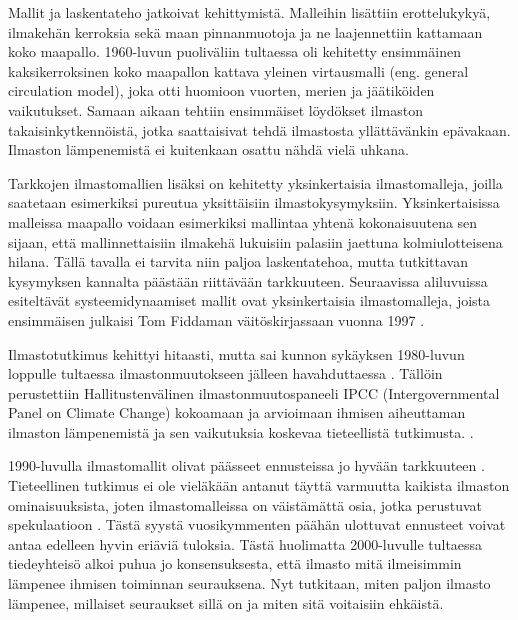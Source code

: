 \documentclass[finnish,12pt,a4paper,pdftex]{article}
\begin{document}
\begin{onehalfspacing}
Mallit ja laskentateho jatkoivat kehittymistä. Malleihin lisättiin erottelukykyä, ilmakehän kerroksia sekä maan pinnanmuotoja ja ne laajennettiin kattamaan koko maapallo. 1960-luvun puoliväliin tultaessa oli kehitetty ensimmäinen kaksikerroksinen koko maapallon kattava yleinen virtausmalli (eng. general circulation model), joka otti huomioon vuorten, merien ja jäätiköiden vaikutukset. \cite{AmericanInstituteofPhysicsGCM} Samaan aikaan tehtiin ensimmäiset löydökset ilmaston takaisinkytkennöistä, jotka saattaisivat tehdä ilmastosta yllättävänkin epävakaan. Ilmaston lämpenemistä ei kuitenkaan osattu nähdä vielä uhkana. \cite{AmericanInstituteofPhysics} 

Tarkkojen ilmastomallien lisäksi on kehitetty yksinkertaisia ilmastomalleja, joilla saatetaan esimerkiksi pureutua yksittäisiin ilmastokysymyksiin. Yksinkertaisissa malleissa maapallo voidaan esimerkiksi mallintaa yhtenä kokonaisuutena sen sijaan, että mallinnettaisiin ilmakehä lukuisiin palasiin jaettuna kolmiulotteisena hilana. Tällä tavalla ei tarvita niin paljoa laskentatehoa, mutta tutkittavan kysymyksen kannalta päästään riittävään tarkkuuteen. \cite{AmericanInstituteofPhysicsSimple} Seuraavissa aliluvuissa esiteltävät systeemidynaamiset mallit ovat yksinkertaisia ilmastomalleja, joista ensimmäisen julkaisi Tom Fiddaman väitöskirjassaan vuonna 1997 \cite{Fiddaman1997}. 

Ilmastotutkimus kehittyi hitaasti, mutta sai kunnon sykäyksen 1980-luvun loppulle tultaessa ilmastonmuutokseen jälleen havahduttaessa  \cite{AmericanInstituteofPhysics}. Tällöin perustettiin Hallitustenvälinen ilmastonmuutospaneeli IPCC (Intergovernmental Panel on Climate Change) kokoamaan ja arvioimaan ihmisen aiheuttaman ilmaston lämpenemistä ja sen vaikutuksia koskevaa tieteellistä tutkimusta. \cite{IPCChistory}. 

1990-luvulla ilmastomallit olivat päässeet ennusteissa jo hyvään tarkkuuteen \cite{AmericanInstituteofPhysics}. Tieteellinen tutkimus ei ole vieläkään antanut täyttä varmuutta kaikista ilmaston ominaisuuksista, joten ilmastomalleissa on väistämättä osia, jotka perustuvat spekulaatioon \cite{CroadsFlightSimulator2011}. Tästä syystä vuosikymmenten päähän ulottuvat ennusteet voivat antaa edelleen hyvin eriäviä tuloksia. Tästä huolimatta 2000-luvulle tultaessa tiedeyhteisö alkoi puhua jo konsensuksesta, että ilmasto mitä ilmeisimmin lämpenee ihmisen toiminnan seurauksena. Nyt tutkitaan, miten paljon ilmasto lämpenee, millaiset seuraukset sillä on ja miten sitä voitaisiin ehkäistä. \cite{AmericanInstituteofPhysics}


\end{onehalfspacing}
\end{document}
